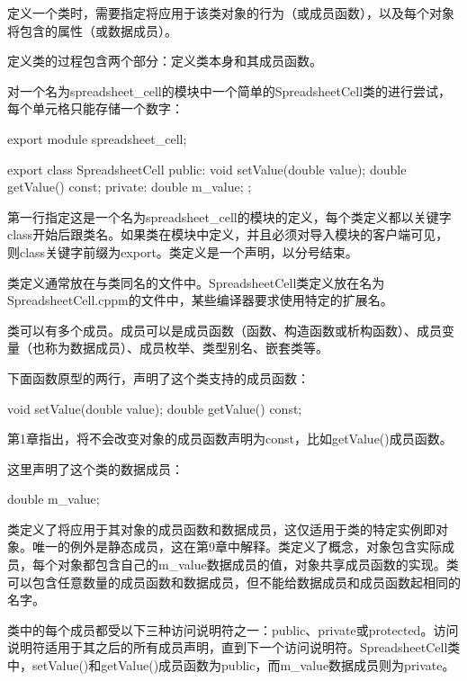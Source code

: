 
定义一个类时，需要指定将应用于该类对象的行为（或成员函数），以及每个对象将包含的属性（或数据成员）。

定义类的过程包含两个部分：定义类本身和其成员函数。


对一个名为spreadsheet\_cell的模块中一个简单的SpreadsheetCell类的进行尝试，每个单元格只能存储一个数字：

\begin{cpp}
export module spreadsheet_cell;

export class SpreadsheetCell
{
    public:
        void setValue(double value);
        double getValue() const;
    private:
        double m_value;
};
\end{cpp}

第一行指定这是一个名为spreadsheet\_cell的模块的定义，每个类定义都以关键字class开始后跟类名。如果类在模块中定义，并且必须对导入模块的客户端可见，则class关键字前缀为export。类定义是一个声明，以分号结束。

类定义通常放在与类同名的文件中。SpreadsheetCell类定义放在名为SpreadsheetCell.cppm的文件中，某些编译器要求使用特定的扩展名。


类可以有多个成员。成员可以是成员函数（函数、构造函数或析构函数）、成员变量（也称为数据成员）、成员枚举、类型别名、嵌套类等。

下面函数原型的两行，声明了这个类支持的成员函数：

\begin{cpp}
void setValue(double value);
double getValue() const;
\end{cpp}

第1章指出，将不会改变对象的成员函数声明为const，比如getValue()成员函数。

这里声明了这个类的数据成员：

\begin{cpp}
double m_value;
\end{cpp}

类定义了将应用于其对象的成员函数和数据成员，这仅适用于类的特定实例即对象。唯一的例外是静态成员，这在第9章中解释。类定义了概念，对象包含实际成员，每个对象都包含自己的m\_value数据成员的值，对象共享成员函数的实现。类可以包含任意数量的成员函数和数据成员，但不能给数据成员和成员函数起相同的名字。


类中的每个成员都受以下三种访问说明符之一：public、private或protected。访问说明符适用于其之后的所有成员声明，直到下一个访问说明符。SpreadsheetCell类中，setValue()和getValue()成员函数为public，而m\_value数据成员则为private。

